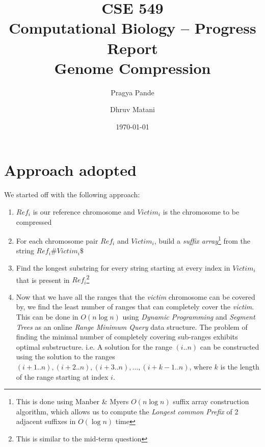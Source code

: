 \documentclass[11pt,twocolumn]{article}
\begin{document}
\title{CSE 549\\Computational Biology -- Progress Report\\Genome Compression}
\author{Pragya Pande \and Dhruv Matani}
\date{\today}

\maketitle

\vspace{0.5in}

\section*{Approach adopted}

We started off with the following approach:
\begin{enumerate}

\item $Ref_i$ is our reference chromosome and $Victim_i$ is the
  chromosome to be compressed

\item For each chromosome pair $Ref_i$ and $Victim_i$, build a \textit{suffix
  array}\footnote{This is done using Manber \& Myers $O(n\log{n})$
  suffix array construction algorithm, which allows us to compute the
  \textit{Longest common Prefix} of 2 adjacent suffixes in
  $O(\log{n})$ time} from the string $Ref_i\#Victim_i\$$

\item Find the longest substring for every string starting at every
  index in $Victim_i$ that is present in $Ref_i$\footnote{This is
    similar to the mid-term question}

\item Now that we have all the ranges that the \textit{victim}
  chromosome can be covered by, we find the least number of ranges
  that can completely cover the \textit{victim}. This can be done in
  $O(n\log{n})$ using \textit{Dynamic Programming} and \textit{Segment
    Trees} as an online \textit{Range Minimum Query} data
  structure. The problem of finding the minimal number of completely
  covering sub-ranges exhibits optimal substructure. i.e. A solution
  for the range $(i..n)$ can be constructed using the solution to the
  ranges $(i+1..n), (i+2..n), (i+3..n), \ldots{}, (i+k-1..n)$, where
  $k$ is the length of the range starting at index $i$.

\end{enumerate}
\end{document}
